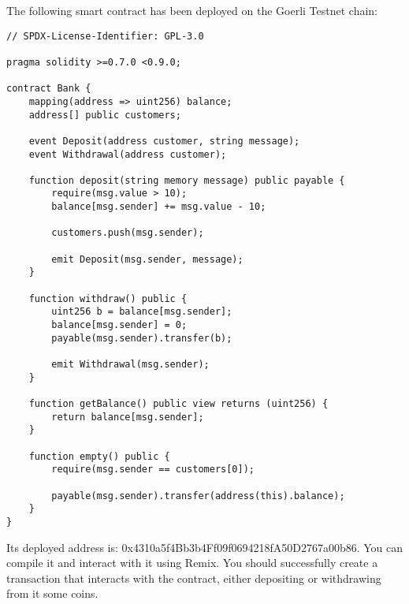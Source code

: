 \documentclass[12pt,addpoints,answers]{exam}
\begin{document}
\begin{questions}
\newpage

\question The following smart contract has been deployed on the Goerli Testnet chain:

{\footnotesize

\begin{verbatim}
// SPDX-License-Identifier: GPL-3.0

pragma solidity >=0.7.0 <0.9.0;

contract Bank {
    mapping(address => uint256) balance;
    address[] public customers;

    event Deposit(address customer, string message);
    event Withdrawal(address customer);

    function deposit(string memory message) public payable {
        require(msg.value > 10);
        balance[msg.sender] += msg.value - 10;

        customers.push(msg.sender);

        emit Deposit(msg.sender, message);
    }

    function withdraw() public {
        uint256 b = balance[msg.sender];
        balance[msg.sender] = 0;
        payable(msg.sender).transfer(b);

        emit Withdrawal(msg.sender);
    }

    function getBalance() public view returns (uint256) {
        return balance[msg.sender];
    }

    function empty() public {
        require(msg.sender == customers[0]);

        payable(msg.sender).transfer(address(this).balance);
    }
}
\end{verbatim}

} %

 Its deployed address is: 0x4310a5f4Bb3b4Ff09f0694218fA50D2767a00b86. You can compile it and interact with it using Remix. You should successfully create a transaction that interacts with the contract, either depositing or withdrawing from it some coins.

\end{questions}
\end{document}
